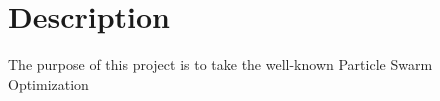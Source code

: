 \section{Description}
The purpose of this project is to take the well-known Particle Swarm Optimization